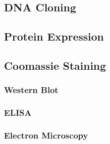 \subsection{DNA Cloning}
\subsection{Protein Expression}
\subsection{Coomassie Staining}
\subsubsection{Western Blot}
\subsubsection{ELISA}
\subsubsection{Electron Microscopy}